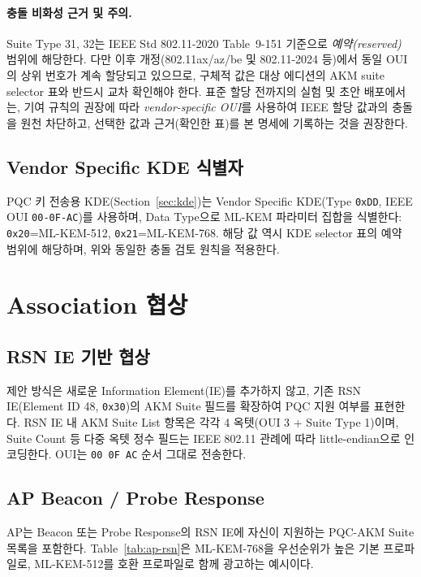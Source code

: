 \documentclass[11pt]{article}
\newcommand{\hex}[1]{\texttt{0x#1}}
\newcommand{\code}[1]{\texttt{#1}}
\theoremstyle{definition}
\theoremstyle{plain}
\begin{document}
\paragraph{충돌 비화성 근거 및 주의.} Suite Type 31, 32는 IEEE Std 802.11-2020
Table~9-151 기준으로 \emph{예약(reserved)} 범위에 해당한다. 다만 이후
개정(802.11ax/az/be 및 802.11-2024 등)에서 동일 OUI의 상위 번호가 계속
할당되고 있으므로, 구체적 값은 대상 에디션의 AKM suite selector 표와 반드시
교차 확인해야 한다. 표준 할당 전까지의 실험 및 초안 배포에서는, 기여 규칙의
권장에 따라 \emph{vendor-specific OUI}를 사용하여 IEEE 할당 값과의 충돌을 원천
차단하고, 선택한 값과 근거(확인한 표)를 본 명세에 기록하는 것을 권장한다.

\subsection{Vendor Specific KDE 식별자}
PQC 키 전송용 KDE(Section~\ref{sec:kde})는 Vendor Specific KDE(Type
\hex{DD}, IEEE OUI \code{00-0F-AC})를 사용하며, Data Type으로 ML-KEM 파라미터
집합을 식별한다: \hex{20}=ML-KEM-512, \hex{21}=ML-KEM-768. 해당 값 역시 KDE
selector 표의 예약 범위에 해당하며, 위와 동일한 충돌 검토 원칙을 적용한다.

\section{Association 협상}\label{sec:assoc}
\subsection{RSN IE 기반 협상}
제안 방식은 새로운 Information Element(IE)를 추가하지 않고, 기존 RSN
IE(Element ID 48, \hex{30})의 AKM Suite 필드를 확장하여 PQC 지원 여부를
표현한다. RSN IE 내 AKM Suite List 항목은 각각 4 옥텟(OUI 3 + Suite Type 1)이며,
Suite Count 등 다중 옥텟 정수 필드는 IEEE 802.11 관례에 따라 little-endian으로
인코딩한다. OUI는 \code{00 0F AC} 순서 그대로 전송한다.

\subsection{AP Beacon / Probe Response}
AP는 Beacon 또는 Probe Response의 RSN IE에 자신이 지원하는 PQC-AKM Suite
목록을 포함한다. Table~\ref{tab:ap-rsn}은 ML-KEM-768을 우선순위가 높은 기본
프로파일로, ML-KEM-512를 호환 프로파일로 함께 광고하는 예시이다.
\end{document}
